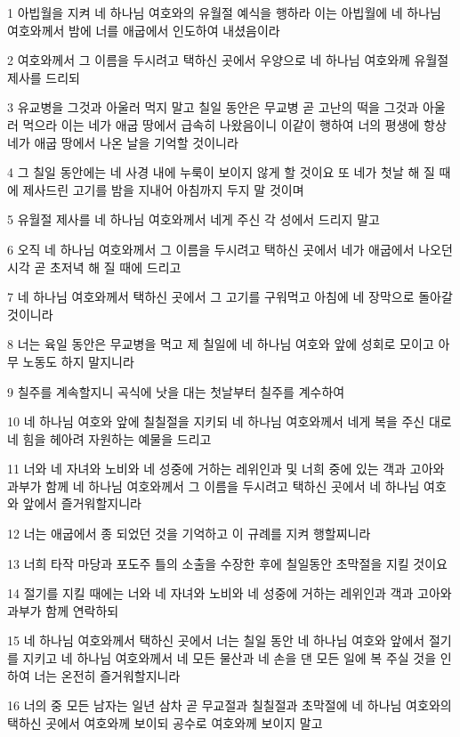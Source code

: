 \par 1 아빕월을 지켜 네 하나님 여호와의 유월절 예식을 행하라 이는 아빕월에 네 하나님 여호와께서 밤에 너를 애굽에서 인도하여 내셨음이라
\par 2 여호와께서 그 이름을 두시려고 택하신 곳에서 우양으로 네 하나님 여호와께 유월절 제사를 드리되
\par 3 유교병을 그것과 아울러 먹지 말고 칠일 동안은 무교병 곧 고난의 떡을 그것과 아울러 먹으라 이는 네가 애굽 땅에서 급속히 나왔음이니 이같이 행하여 너의 평생에 항상 네가 애굽 땅에서 나온 날을 기억할 것이니라
\par 4 그 칠일 동안에는 네 사경 내에 누룩이 보이지 않게 할 것이요 또 네가 첫날 해 질 때에 제사드린 고기를 밤을 지내어 아침까지 두지 말 것이며
\par 5 유월절 제사를 네 하나님 여호와께서 네게 주신 각 성에서 드리지 말고
\par 6 오직 네 하나님 여호와께서 그 이름을 두시려고 택하신 곳에서 네가 애굽에서 나오던 시각 곧 초저녁 해 질 때에 드리고
\par 7 네 하나님 여호와께서 택하신 곳에서 그 고기를 구워먹고 아침에 네 장막으로 돌아갈 것이니라
\par 8 너는 육일 동안은 무교병을 먹고 제 칠일에 네 하나님 여호와 앞에 성회로 모이고 아무 노동도 하지 말지니라
\par 9 칠주를 계속할지니 곡식에 낫을 대는 첫날부터 칠주를 계수하여
\par 10 네 하나님 여호와 앞에 칠칠절을 지키되 네 하나님 여호와께서 네게 복을 주신 대로 네 힘을 헤아려 자원하는 예물을 드리고
\par 11 너와 네 자녀와 노비와 네 성중에 거하는 레위인과 및 너희 중에 있는 객과 고아와 과부가 함께 네 하나님 여호와께서 그 이름을 두시려고 택하신 곳에서 네 하나님 여호와 앞에서 즐거워할지니라
\par 12 너는 애굽에서 종 되었던 것을 기억하고 이 규례를 지켜 행할찌니라
\par 13 너희 타작 마당과 포도주 틀의 소출을 수장한 후에 칠일동안 초막절을 지킬 것이요
\par 14 절기를 지킬 때에는 너와 네 자녀와 노비와 네 성중에 거하는 레위인과 객과 고아와 과부가 함께 연락하되
\par 15 네 하나님 여호와께서 택하신 곳에서 너는 칠일 동안 네 하나님 여호와 앞에서 절기를 지키고 네 하나님 여호와께서 네 모든 물산과 네 손을 댄 모든 일에 복 주실 것을 인하여 너는 온전히 즐거워할지니라
\par 16 너의 중 모든 남자는 일년 삼차 곧 무교절과 칠칠절과 초막절에 네 하나님 여호와의 택하신 곳에서 여호와께 보이되 공수로 여호와께 보이지 말고
